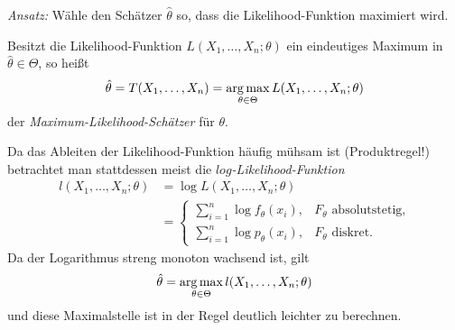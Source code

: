 \emph{Ansatz:} Wähle den Schätzer $\hat{\theta}$ so, dass die
Likelihood-Funktion maximiert wird.

\begin{defn} %
  Besitzt die Likelihood-Funktion $L(X_1, \ldots, X_n; \theta)$ ein eindeutiges
  Maximum in $\hat{\theta} \in \Theta$, so heißt
  \[ \hat{\theta} = T(X_1, \ldots, X_n ) = \operatorname*{arg\,max}_{\theta \in \Theta} L(X_1,
    \ldots, X_n; \theta ) \]
  der \emph{Maximum-Likelihood-Schätzer} für $\theta$.

  Da das Ableiten der Likelihood-Funktion häufig mühsam ist (Produktregel!)
  betrachtet man stattdessen meist die \emph{$log$-Likelihood-Funktion}
  \[ \begin{aligned}
      l( X_1, \ldots, X_n; \theta )
      &= \log L( X_1, \ldots, X_n; \theta ) \\
      &= \begin{cases}
        \sum_{i=1}^n \log f_\theta(x_i), &F_\theta \text{ absolutstetig,} \\
        \sum_{i=1}^n \log p_\theta(x_i), &F_\theta \text{ diskret.}
      \end{cases}
    \end{aligned}
  \]
  Da der Logarithmus streng monoton wachsend ist, gilt
  \[ \hat{\theta} = \operatorname*{arg\,max}_{\theta \in \Theta} l(X_1, \ldots, X_n; \theta ) \]
  und diese Maximalstelle ist in der Regel deutlich leichter zu berechnen.
\end{defn}

